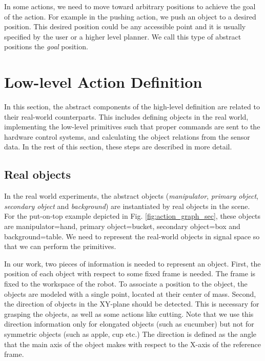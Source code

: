 In some actions, we need to move toward arbitrary positions to achieve the goal of the action.
For example in the pushing action, we push an object to a desired position.
This desired position could be any accessible point and it is usually specified by the user or a higher level planner.
We call this type of abstract positions the \textit{goal} position.

\section{Low-level Action Definition}
\label{sec:low-level}
In this section, the abstract components of the high-level definition are related to their real-world counterparts.
This includes defining objects in the real world, implementing the low-level primitives such that proper commands are sent to the hardware control systems,
and calculating the object relations from the sensor data.
In the rest of this section, these steps are described in more detail.

\subsection{Real objects}
In the real world experiments, the abstract objects (\textit{manipulator}, \textit{primary object}, \textit{secondary object} and \textit{background})
are instantiated by real objects in the scene.
For the put-on-top example depicted in Fig. \ref{fig:action_graph_sec},
these objects are manipulator=hand, primary object=bucket, secondary object=box and background=table.
We need to represent the real-world objects in signal space so that we can perform the primitives.

In our work, two pieces of information is needed to represent an object.
First, the position of each object with respect to some fixed frame is needed.
The frame is fixed to the workspace of the robot.
To associate a position to the object, the objects are modeled with a single point, located at their center of mass.
Second, the direction of objects in the XY-plane should be detected.
This is necessary for grasping the objects, as well as some actions like cutting.
Note that we use this direction information only for elongated objects (such as cucumber) but not for symmetric objects (such as apple, cup etc.)
The direction is defined as the angle that the main axis of the object makes with respect to the X-axis of the reference frame.

